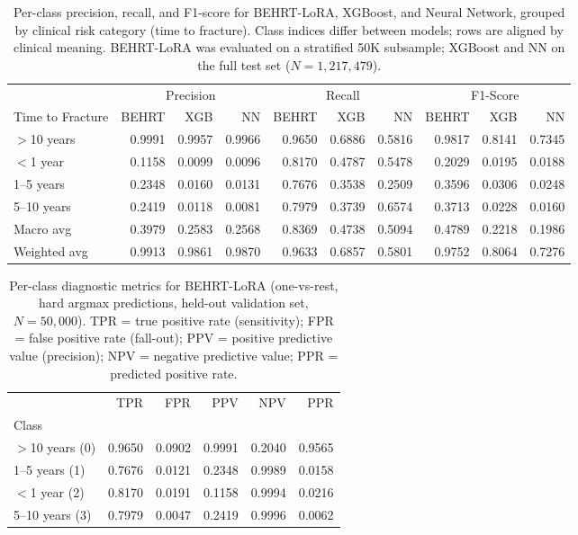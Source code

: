 \documentclass{article}
\begin{document}
\begin{table}
\caption{Per-class precision, recall, and F1-score for BEHRT-LoRA, XGBoost, and Neural Network, 
grouped by clinical risk category (time to fracture). 
Class indices differ between models; rows are aligned by clinical meaning.
BEHRT-LoRA was evaluated on a stratified 50K subsample; XGBoost and NN on the full test set ($N=1{,}217{,}479$).}
\label{tab:perclass_comparison}
\begin{tabular}{l rrr rrr rrr}
\toprule
 & \multicolumn{3}{c}{Precision} & \multicolumn{3}{c}{Recall} & \multicolumn{3}{c}{F1-Score} \\
\cmidrule(lr){2-4} \cmidrule(lr){5-7} \cmidrule(lr){8-10}
Time to Fracture & BEHRT & XGB & NN & BEHRT & XGB & NN & BEHRT & XGB & NN \\
\midrule
$>$10 years  & 0.9991 & 0.9957 & 0.9966 & 0.9650 & 0.6886 & 0.5816 & 0.9817 & 0.8141 & 0.7345 \\
$<$1 year    & 0.1158 & 0.0099 & 0.0096 & 0.8170 & 0.4787 & 0.5478 & 0.2029 & 0.0195 & 0.0188 \\
1--5 years   & 0.2348 & 0.0160 & 0.0131 & 0.7676 & 0.3538 & 0.2509 & 0.3596 & 0.0306 & 0.0248 \\
5--10 years  & 0.2419 & 0.0118 & 0.0081 & 0.7979 & 0.3739 & 0.6574 & 0.3713 & 0.0228 & 0.0160 \\
\midrule
Macro avg    & 0.3979 & 0.2583 & 0.2568 & 0.8369 & 0.4738 & 0.5094 & 0.4789 & 0.2218 & 0.1986 \\
Weighted avg & 0.9913 & 0.9861 & 0.9870 & 0.9633 & 0.6857 & 0.5801 & 0.9752 & 0.8064 & 0.7276 \\
\bottomrule
\end{tabular}
\end{table}

\begin{table}
\caption{Per-class diagnostic metrics for BEHRT-LoRA (one-vs-rest, hard argmax predictions, held-out validation set, $N=50{,}000$). TPR = true positive rate (sensitivity); FPR = false positive rate (fall-out); PPV = positive predictive value (precision); NPV = negative predictive value; PPR = predicted positive rate.}
\label{tab:diagnostic_metrics}
\begin{tabular}{lrrrrr}
\toprule
 & TPR & FPR & PPV & NPV & PPR \\
Class &  &  &  &  &  \\
\midrule
$>$10 years (0) & 0.9650 & 0.0902 & 0.9991 & 0.2040 & 0.9565 \\
1–5 years (1) & 0.7676 & 0.0121 & 0.2348 & 0.9989 & 0.0158 \\
$<$1 year (2) & 0.8170 & 0.0191 & 0.1158 & 0.9994 & 0.0216 \\
5–10 years (3) & 0.7979 & 0.0047 & 0.2419 & 0.9996 & 0.0062 \\
\bottomrule
\end{tabular}
\end{table}
\end{document}
